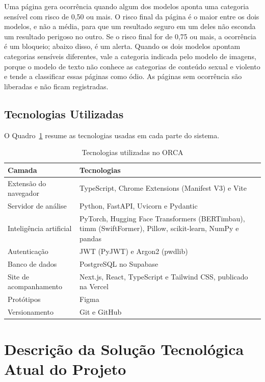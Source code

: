 \documentclass[
    12pt,           %
    oneside,        %
    a4paper,        %
    chapter=TITLE,  %
    english,        %
    brazil          %
]{abntex2}
\begin{document}
Uma página gera ocorrência quando algum dos modelos aponta uma categoria
sensível com risco de 0,50 ou mais. O risco final da página é o maior entre
os dois modelos, e não a média, para que um resultado seguro em um deles não
esconda um resultado perigoso no outro. Se o risco final for de 0,75 ou mais,
a ocorrência é um bloqueio; abaixo disso, é um alerta. Quando os dois modelos
apontam categorias sensíveis diferentes, vale a categoria indicada pelo modelo
de imagens, porque o modelo de texto não conhece as categorias de conteúdo
sexual e violento e tende a classificar essas páginas como ódio. As páginas
sem ocorrência são liberadas e não ficam registradas.
\section{Tecnologias Utilizadas}

O Quadro~\ref{tab:tecnologias} resume as tecnologias usadas em cada parte do
sistema.
\begin{table}[htbp]
\centering
\small
\renewcommand{\arraystretch}{1.3}
\begin{tabular}{|p{3.6cm}|p{10.2cm}|}
\hline
\textbf{Camada} & \textbf{Tecnologias} \\ \hline
Extensão do navegador & TypeScript, Chrome Extensions (Manifest V3) e Vite \\ \hline
Servidor de análise & Python, FastAPI, Uvicorn e Pydantic \\ \hline
Inteligência artificial & PyTorch, Hugging Face Transformers (BERTimbau), timm (SwiftFormer), Pillow, scikit-learn, NumPy e pandas \\ \hline
Autenticação & JWT (PyJWT) e Argon2 (pwdlib) \\ \hline
Banco de dados & PostgreSQL no Supabase \\ \hline
Site de acompanhamento & Next.js, React, TypeScript e Tailwind CSS, publicado na Vercel \\ \hline
Protótipos & Figma \\ \hline
Versionamento & Git e GitHub \\ \hline
\end{tabular}
\caption{Tecnologias utilizadas no ORCA}
\label{tab:tecnologias}
\end{table}

\chapter{Descrição da Solução Tecnológica Atual do Projeto}
\label{cap:solucao}
\end{document}
